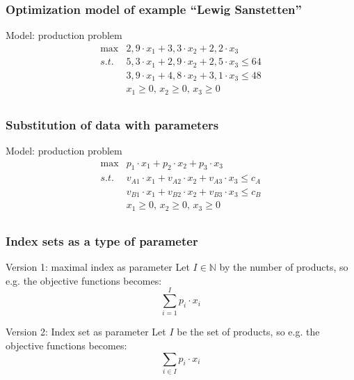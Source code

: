 \begin{frame}
 \frametitle{Optimization model of example ``Lewig Sanstetten''}
 \begin{block}{Model: production problem}
 \Large
 \begin{equation*}
  \begin{array}{ll}
    \max & 2,9\cdot x_1 + 3,3\cdot x_2 + 2,2\cdot x_3\\
    s.t. & 5,3\cdot x_1 + 2,9\cdot x_2 + 2,5\cdot x_3 \leq 64\\
	  & 3,9\cdot x_1 + 4,8\cdot x_2 + 3,1\cdot x_3 \leq 48\\
	  & x_1\geq0,\,x_2\geq0,\,x_3\geq0\\
  \end{array}
 \end{equation*}
 \end{block}
\end{frame}

\begin{frame}
 \frametitle{Substitution of data with parameters}
 \begin{block}{Model: production problem}
 \Large
 \begin{equation*}
  \begin{array}{ll}
  \max & p_1\cdot x_1 + p_2\cdot x_2 + p_3\cdot x_3\\
  s.t. & v_{A1}\cdot x_1 + v_{A2}\cdot x_2 + v_{A3}\cdot x_3 \leq c_A\\
	& v_{B1}\cdot x_1 + v_{B2}\cdot x_2 + v_{B3}\cdot x_3 \leq c_B\\
	& x_1\geq0,\,x_2\geq0,\,x_3\geq0\\
  \end{array}
 \end{equation*}
 \end{block}
\end{frame}

\begin{frame}
 \frametitle{Index sets as a type of parameter}
 \begin{block}{Version 1: maximal index as parameter}
  Let $I\in\mathbb{N}$ by the number of products, so e.g. the objective functions becomes:
  \[
   \sum_{i=1}^I p_i \cdot x_i
  \]
 \end{block}
 \begin{block}{Version 2: Index set as parameter}
  Let $I$ be the set of products, so e.g. the objective functions becomes:
  \[
   \sum_{i\in I} p_i\cdot x_i
  \]
 \end{block}
\end{frame}


